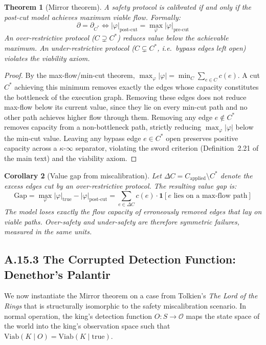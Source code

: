 \documentclass[11pt,a4paper]{article}
\newtheorem{theorem}{Theorem}[section]
\newtheorem{corollary}[theorem]{Corollary}
\theoremstyle{definition}
\theoremstyle{remark}
\newcommand{\Viab}{\mathrm{Viab}}
\begin{document}
\begin{theorem}[Mirror theorem]\label{thm:mirror}
A safety protocol is calibrated if and only if the post-cut model achieves maximum viable flow. Formally:
\[
  \partial = \partial_{C^*} \iff |\varphi|_{\text{post-cut}} = \max_\varphi |\varphi|_{\text{pre-cut}}
\]
An over-restrictive protocol ($C \supsetneq C^*$) reduces value below the achievable maximum. An under-restrictive protocol ($C \subsetneq C^*$, i.e.\ bypass edges left open) violates the viability axiom.
\end{theorem}

\begin{proof}
By the max-flow/min-cut theorem, $\max_\varphi |\varphi| = \min_C \sum_{e \in C} c(e)$. A cut $C^*$ achieving this minimum removes exactly the edges whose capacity constitutes the bottleneck of the execution graph. Removing these edges does not reduce max-flow below its current value, since they lie on every min-cut path and no other path achieves higher flow through them. Removing any edge $e \notin C^*$ removes capacity from a non-bottleneck path, strictly reducing $\max_\varphi |\varphi|$ below the min-cut value. Leaving any bypass edge $e \in C^*$ open preserves positive capacity across a $\kappa$-$\infty$ separator, violating the sword criterion (Definition~2.21 of the main text) and the viability axiom.
\end{proof}

\begin{corollary}[Value gap from miscalibration]\label{cor:gap}
Let $\Delta C = C_{\text{applied}} \setminus C^*$ denote the excess edges cut by an over-restrictive protocol. The resulting value gap is:
\[
  \text{Gap} = \max_\varphi |\varphi|_{\text{true}} - |\varphi|_{\text{post-cut}} = \sum_{e \in \Delta C} c(e) \cdot \mathbf{1}[e \text{ lies on a max-flow path}]
\]
The model loses exactly the flow capacity of erroneously removed edges that lay on viable paths. Over-safety and under-safety are therefore symmetric failures, measured in the same units.
\end{corollary}


\subsection{A.15.3 The Corrupted Detection Function: Denethor's Palantir}

We now instantiate the Mirror theorem on a case from Tolkien's \emph{The Lord of the Rings} that is structurally isomorphic to the safety miscalibration scenario. In normal operation, the king's detection function $O: S \to \mathcal{O}$ maps the state space of the world into the king's observation space such that $\Viab(K \mid O) = \Viab(K \mid \text{true})$.
\end{document}
